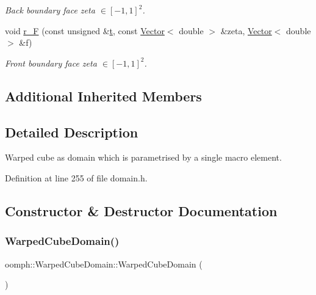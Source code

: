 \begin{DoxyCompactItemize}
\begin{DoxyCompactList}\small\item\em Back boundary face zeta $ \in [-1,1]^2 $. \end{DoxyCompactList}\item 
void \hyperlink{classoomph_1_1WarpedCubeDomain_a740c2b20507118f9e4a98490a13271f8}{r\+\_\+F} (const unsigned \&\hyperlink{cfortran_8h_af6f0bd3dc13317f895c91323c25c2b8f}{t}, const \hyperlink{classoomph_1_1Vector}{Vector}$<$ double $>$ \&zeta, \hyperlink{classoomph_1_1Vector}{Vector}$<$ double $>$ \&f)
\begin{DoxyCompactList}\small\item\em Front boundary face zeta $ \in [-1,1]^2 $. \end{DoxyCompactList}\end{DoxyCompactItemize}
\subsection*{Additional Inherited Members}


\subsection{Detailed Description}
Warped cube as domain which is parametrised by a single macro element. 

Definition at line 255 of file domain.\+h.



\subsection{Constructor \& Destructor Documentation}
\mbox{\label{classoomph_1_1WarpedCubeDomain_af83d4c7153b29b84b4783fe1b47eee2f}} 
\subsubsection{\texorpdfstring{Warped\+Cube\+Domain()}{WarpedCubeDomain()}\hspace{0.1cm}{\footnotesize\ttfamily [1/2]}}
{\footnotesize\ttfamily oomph\+::\+Warped\+Cube\+Domain\+::\+Warped\+Cube\+Domain (\begin{DoxyParamCaption}{ }\end{DoxyParamCaption})\hspace{0.3cm}{\ttfamily [inline]}}



